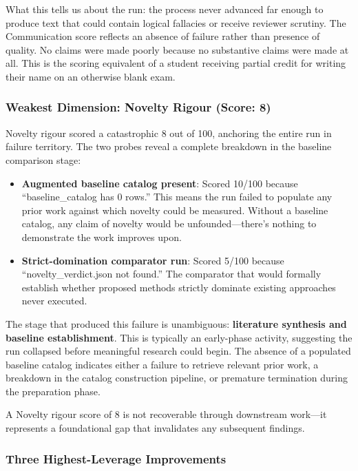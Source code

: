 \documentclass[10pt,letterpaper]{article}
\begin{document}
What this tells us about the run: the process never advanced far enough to produce text that could contain logical fallacies or receive reviewer scrutiny. The Communication score reflects an absence of failure rather than presence of quality. No claims were made poorly because no substantive claims were made at all. This is the scoring equivalent of a student receiving partial credit for writing their name on an otherwise blank exam.

\hypertarget{weakest-dimension-novelty-rigour-score-8}{%
\subsubsection{Weakest Dimension: Novelty Rigour (Score: 8)}\label{weakest-dimension-novelty-rigour-score-8}}

Novelty rigour scored a catastrophic 8 out of 100, anchoring the entire run in failure territory. The two probes reveal a complete breakdown in the baseline comparison stage:

\begin{itemize}
\item
  \textbf{Augmented baseline catalog present}: Scored 10/100 because ``baseline\_catalog has 0 rows.'' This means the run failed to populate any prior work against which novelty could be measured. Without a baseline catalog, any claim of novelty would be unfounded---there's nothing to demonstrate the work improves upon.
\item
  \textbf{Strict-domination comparator run}: Scored 5/100 because ``novelty\_verdict.json not found.'' The comparator that would formally establish whether proposed methods strictly dominate existing approaches never executed.
\end{itemize}

The stage that produced this failure is unambiguous: \textbf{literature synthesis and baseline establishment}. This is typically an early-phase activity, suggesting the run collapsed before meaningful research could begin. The absence of a populated baseline catalog indicates either a failure to retrieve relevant prior work, a breakdown in the catalog construction pipeline, or premature termination during the preparation phase.

A Novelty rigour score of 8 is not recoverable through downstream work---it represents a foundational gap that invalidates any subsequent findings.

\hypertarget{three-highest-leverage-improvements}{%
\subsubsection{Three Highest-Leverage Improvements}\label{three-highest-leverage-improvements}}
\end{document}
